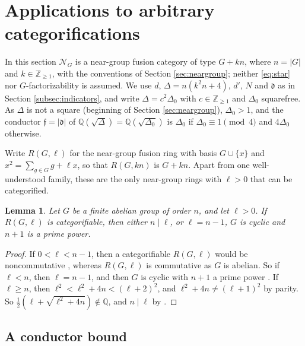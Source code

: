 \documentclass[10pt]{article}
\theoremstyle{plain}
\newtheorem{lemma}[theorem]{Lemma}
\theoremstyle{definition}
\theoremstyle{plain}
\begin{document}

\section{Applications to arbitrary categorifications}\label{sec:application}

In this section $\mathcal{N}_G$ is a near-group fusion category of type $G+kn$, where $n=|G|$ and $k\in\mathbb{Z}_{\geq1}$, with the conventions of Section \ref{sec:neargroup}; neither \eqref{eq:star} nor $G$-factorizability is assumed. We use $d$, $\Delta=n(k^2n+4)$, $d'$, $N$ and $\mathfrak{d}$ as in Section \ref{subsec:indicators}, and write $\Delta=c^2\Delta_0$ with $c\in\mathbb{Z}_{\geq1}$ and $\Delta_0$ squarefree. As $\Delta$ is not a square (beginning of Section \ref{sec:neargroup}), $\Delta_0>1$, and the conductor $\mathfrak{f}=|\mathfrak{d}|$ of $\mathbb{Q}(\sqrt\Delta)=\mathbb{Q}(\sqrt{\Delta_0})$ is $\Delta_0$ if $\Delta_0\equiv1\pmod4$ and $4\Delta_0$ otherwise.

\par Write $R(G,\ell)$ for the near-group fusion ring with basis $G\cup\{x\}$ and $x^2=\sum_{g\in G}g+\ell x$, so that $R(G,kn)$ is $G+kn$. Apart from one well-understood family, these are the only near-group rings with $\ell>0$ that can be categorified.

\begin{lemma}\label{lem:levels}
Let $G$ be a finite abelian group of order $n$, and let $\ell>0$. If $R(G,\ell)$ is categorifiable, then either $n\mid\ell$, or $\ell=n-1$, $G$ is cyclic and $n+1$ is a prime power.
\end{lemma}

\begin{proof}
If $0<\ell<n-1$, then a categorifiable $R(G,\ell)$ would be noncommutative \cite[Proposition 3.2]{MR4655273}, whereas $R(G,\ell)$ is commutative as $G$ is abelian. So if $\ell<n$, then $\ell=n-1$, and then $G$ is cyclic with $n+1$ a prime power \cite[Theorem 1.2]{Siehler03}. If $\ell\geq n$, then $\ell^2<\ell^2+4n<(\ell+2)^2$, and $\ell^2+4n\neq(\ell+1)^2$ by parity. So $\frac12(\ell+\sqrt{\ell^2+4n})\notin\mathbb{Q}$, and $n\mid\ell$ by \cite[Proposition 3.3]{MR4655273}.
\end{proof}

\subsection{A conductor bound}
\end{document}
